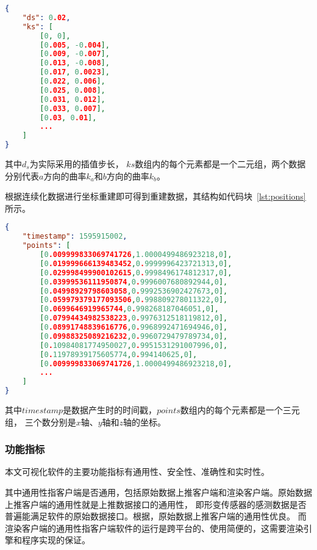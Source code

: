 \begin{lstlisting}[language=json,firstnumber=1,label={lst:curvature-vec},caption={插值曲率数据样例}]
{
    "ds": 0.02,
    "ks": [
        [0, 0],
        [0.005, -0.004],
        [0.009, -0.007],
        [0.013, -0.008],
        [0.017, 0.0023],
        [0.022, 0.006],
        [0.025, 0.008],
        [0.031, 0.012],
        [0.033, 0.007],
        [0.03, 0.01],
        ...
    ]
}
\end{lstlisting}

其中$d_s$为实际采用的插值步长，
$ks$数组内的每个元素都是一个二元组，两个数据分别代表$a$方向的曲率$k_a$和$b$方向的曲率$k_b$。

根据连续化数据进行坐标重建即可得到重建数据，其结构如代码块~\ref{lst:positions}所示。

\begin{lstlisting}[language=json,firstnumber=1,label={lst:positions},caption={重建坐标点数据样例}]
{
    "timestamp": 1595915002,
    "points": [
        [0.009999833069741726,1.0000499486923218,0],
        [0.019999666139483452,0.9999996423721313,0],
        [0.029998499900102615,0.9998496174812317,0],
        [0.03999536111950874,0.9996007680892944,0],
        [0.04998929798603058,0.9992536902427673,0],
        [0.059979379177093506,0.998809278011322,0],
        [0.0699646919965744,0.998268187046051,0],
        [0.07994434982538223,0.9976312518119812,0],
        [0.08991748839616776,0.9968992471694946,0],
        [0.09988325089216232,0.9960729479789734,0],
        [0.10984081774950027,0.9951531291007996,0],
        [0.11978939175605774,0.994140625,0],
        [0.009999833069741726,1.0000499486923218,0],
        ...
    ]
}
\end{lstlisting}

其中$timestamp$是数据产生时的时间戳，$points$数组内的每个元素都是一个三元组，
三个数分别是$x$轴、$y$轴和$z$轴的坐标。

\subsubsection{功能指标}
本文可视化软件的主要功能指标有通用性、安全性、准确性和实时性。

其中通用性指客户端是否通用，包括原始数据上推客户端和渲染客户端。原始数据上推客户端的通用性就是上推数据接口的通用性，
即形变传感器的感测数据是否普遍能满足软件的原始数据接口。根据，原始数据上推客户端的通用性优良。
而渲染客户端的通用性指客户端软件的运行是跨平台的、使用简便的，这需要渲染引擎和程序实现的保证。

